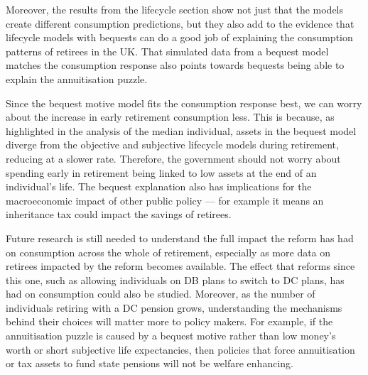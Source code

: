 \documentclass[12pt]{article}
\begin{document}
Moreover, the results from the lifecycle section show not just that the models
create different consumption predictions, but they also add to the evidence that
lifecycle models with bequests can do a good job of explaining the consumption
patterns of retirees in the UK. That simulated data from a bequest model matches
the consumption response also points towards bequests being able to explain the
annuitisation puzzle.

Since the bequest motive model fits the consumption response best, we can worry
about the increase in early retirement consumption less. This is because, as
highlighted in the analysis of the median individual, assets in the bequest model
diverge from the objective and subjective lifecycle models during retirement,
reducing at a slower rate. Therefore, the government should not worry about
spending early in retirement being linked to low assets at the end of an
individual's life. The bequest explanation also has implications for the
macroeconomic impact of other public policy --- for example it means an
inheritance tax could impact the savings of retirees.

Future research is still needed to understand the full impact the reform has had
on consumption across the whole of retirement, especially as more data on
retirees impacted by the reform becomes available. The effect that reforms since
this one, such as allowing individuals on DB plans to switch to DC plans, has
had on consumption could also be studied. Moreover, as the number of individuals
retiring with a DC pension grows, understanding the mechanisms
behind their choices will matter more to policy makers. For example, if the
annuitisation puzzle is caused by a bequest motive rather than low money's worth
or short subjective life expectancies, then policies that force annuitisation or
tax assets to fund state pensions will not be welfare enhancing.






\end{document}
